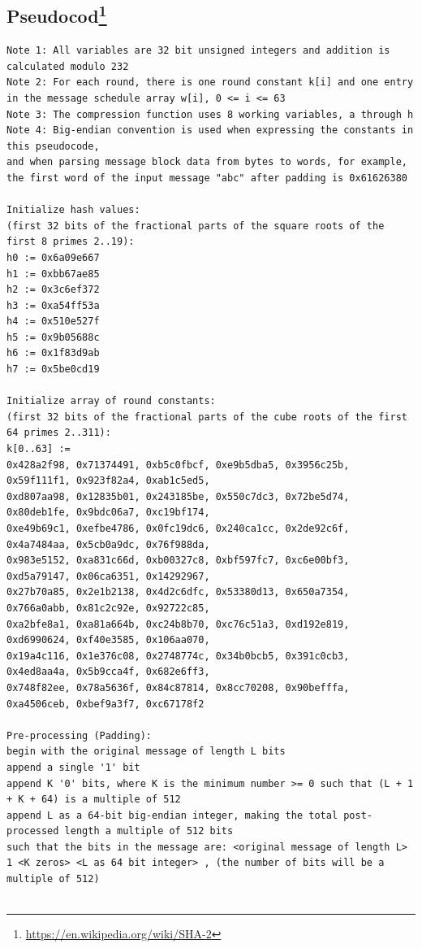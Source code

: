 \documentclass{article}
\begin{document}
\subsection[Pseudocod]{Pseudocod\footnote{\url{https://en.wikipedia.org/wiki/SHA-2}}}

\begin{lstlisting}[basicstyle=\small,breaklines=true, frame=single]
Note 1: All variables are 32 bit unsigned integers and addition is calculated modulo 232
Note 2: For each round, there is one round constant k[i] and one entry in the message schedule array w[i], 0 <= i <= 63
Note 3: The compression function uses 8 working variables, a through h
Note 4: Big-endian convention is used when expressing the constants in this pseudocode,
and when parsing message block data from bytes to words, for example,
the first word of the input message "abc" after padding is 0x61626380

Initialize hash values:
(first 32 bits of the fractional parts of the square roots of the first 8 primes 2..19):
h0 := 0x6a09e667
h1 := 0xbb67ae85
h2 := 0x3c6ef372
h3 := 0xa54ff53a
h4 := 0x510e527f
h5 := 0x9b05688c
h6 := 0x1f83d9ab
h7 := 0x5be0cd19

Initialize array of round constants:
(first 32 bits of the fractional parts of the cube roots of the first 64 primes 2..311):
k[0..63] :=
0x428a2f98, 0x71374491, 0xb5c0fbcf, 0xe9b5dba5, 0x3956c25b, 0x59f111f1, 0x923f82a4, 0xab1c5ed5,
0xd807aa98, 0x12835b01, 0x243185be, 0x550c7dc3, 0x72be5d74, 0x80deb1fe, 0x9bdc06a7, 0xc19bf174,
0xe49b69c1, 0xefbe4786, 0x0fc19dc6, 0x240ca1cc, 0x2de92c6f, 0x4a7484aa, 0x5cb0a9dc, 0x76f988da,
0x983e5152, 0xa831c66d, 0xb00327c8, 0xbf597fc7, 0xc6e00bf3, 0xd5a79147, 0x06ca6351, 0x14292967,
0x27b70a85, 0x2e1b2138, 0x4d2c6dfc, 0x53380d13, 0x650a7354, 0x766a0abb, 0x81c2c92e, 0x92722c85,
0xa2bfe8a1, 0xa81a664b, 0xc24b8b70, 0xc76c51a3, 0xd192e819, 0xd6990624, 0xf40e3585, 0x106aa070,
0x19a4c116, 0x1e376c08, 0x2748774c, 0x34b0bcb5, 0x391c0cb3, 0x4ed8aa4a, 0x5b9cca4f, 0x682e6ff3,
0x748f82ee, 0x78a5636f, 0x84c87814, 0x8cc70208, 0x90befffa, 0xa4506ceb, 0xbef9a3f7, 0xc67178f2

Pre-processing (Padding):
begin with the original message of length L bits
append a single '1' bit
append K '0' bits, where K is the minimum number >= 0 such that (L + 1 + K + 64) is a multiple of 512
append L as a 64-bit big-endian integer, making the total post-processed length a multiple of 512 bits
such that the bits in the message are: <original message of length L> 1 <K zeros> <L as 64 bit integer> , (the number of bits will be a multiple of 512)


\end{lstlisting}
\end{document}
